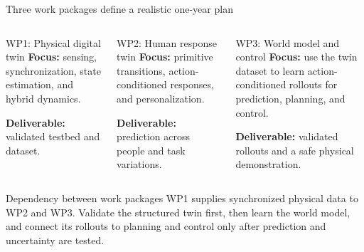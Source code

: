 \documentclass[aspectratio=169,11pt]{beamer}
\begin{document}
\begin{frame}{Three work packages define a realistic one-year plan}
\begin{columns}[T,onlytextwidth]
\begin{block}{WP1: Physical digital twin}
\textbf{Focus:} sensing, synchronization, state estimation, and hybrid dynamics.

\textbf{Deliverable:} validated testbed and dataset.
\end{block}
\begin{block}{WP2: Human response twin}
\textbf{Focus:} primitive transitions, action-conditioned responses, and personalization.

\textbf{Deliverable:} prediction across people and task variations.
\end{block}
\begin{block}{WP3: World model and control}
\textbf{Focus:} use the twin dataset to learn action-conditioned rollouts for prediction, planning, and control.

\textbf{Deliverable:} validated rollouts and a safe physical demonstration.
\end{block}
\end{columns}
\vspace{0.22cm}
\begin{alertblock}{Dependency between work packages}
WP1 supplies synchronized physical data to WP2 and WP3. Validate the structured twin first, then learn the world model, and connect its rollouts to planning and control only after prediction and uncertainty are tested.
\end{alertblock}
\end{frame}

\end{document}
